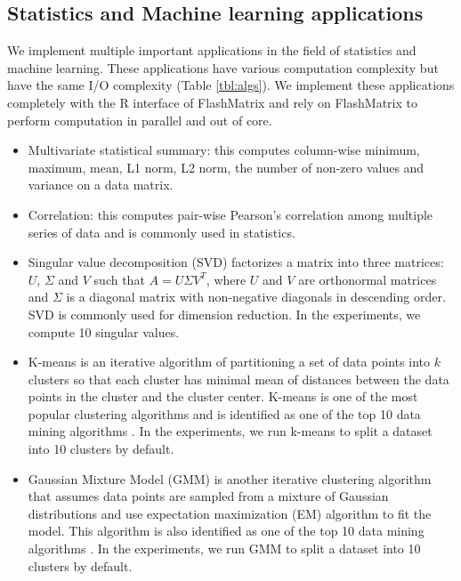 \subsection{Statistics and Machine learning applications} \label{sec:apps}
We implement multiple important applications in the field of statistics and
machine learning. These applications have various computation complexity but
have the same I/O complexity (Table \ref{tbl:algs}). We implement these
applications completely with the R interface of FlashMatrix and
rely on FlashMatrix to perform computation in parallel and out of core.
\begin{itemize}
	\item Multivariate statistical summary: this computes column-wise minimum,
		maximum, mean, L1 norm, L2 norm, the number of non-zero values and
		variance on a data matrix.
	\item Correlation: this computes pair-wise Pearson's correlation \cite{cor}
		among multiple series of data and is commonly used in statistics.
	\item Singular value decomposition (SVD) factorizes a matrix into
		three matrices: $U$, $\Sigma$ and $V$ such that $A=U \Sigma V^T$, where
		$U$ and $V$ are orthonormal matrices and $\Sigma$ is a diagonal
		matrix with non-negative diagonals in descending order. SVD is commonly
		used for dimension reduction. In the experiments, we compute 10 singular
		values.
	\item K-means \cite{kmeans} is an iterative algorithm of partitioning a set
		of data points into $k$ clusters so that each cluster has minimal mean
		of distances between the data points in the cluster and the cluster
		center. K-means
		is one of the most popular clustering algorithms and is identified as
		one of the top 10 data mining algorithms \cite{top10}. In the experiments,
		we run k-means to split a dataset into 10 clusters by default.
	\item Gaussian Mixture Model (GMM) \cite{gmm} is another iterative clustering
		algorithm that assumes data points are sampled from a mixture of
		Gaussian distributions and use expectation maximization (EM) \cite{gmm}
		algorithm to fit the model. This algorithm is also identified as one
		of the top 10 data mining algorithms \cite{top10}. In the experiments,
		we run GMM to split a dataset into 10 clusters by default.
\end{itemize}

